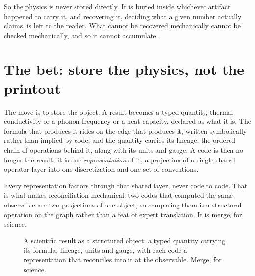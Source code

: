 \documentclass[11pt,a4paper]{article}
\begin{document}
So the physics is never stored directly. It is buried inside whichever artifact
happened to carry it, and recovering it, deciding what a given number actually
claims, is left to the reader. What cannot be recovered mechanically cannot be
checked mechanically, and so it cannot accumulate.

\section{The bet: store the physics, not the printout}

The move is to store the object. A result becomes a typed quantity, thermal
conductivity or a phonon frequency or a heat capacity, declared as what it is. The
formula that produces it rides on the edge that produces it, written symbolically
rather than implied by code, and the quantity carries its lineage, the ordered
chain of operations behind it, along with its units and gauge. A code is then no
longer the result; it is one \emph{representation} of it, a projection of a single
shared operator layer into one discretization and one set of conventions.

Every representation factors through that shared layer, never code to code. That
is what makes reconciliation mechanical: two codes that computed the same
observable are two projections of one object, so comparing them is a structural
operation on the graph rather than a feat of expert translation. It is merge, for
science.

\begin{figure}[h]
\centering
{}
\caption{A scientific result as a structured object: a typed quantity carrying its
formula, lineage, units and gauge, with each code a representation that reconciles
into it at the observable. Merge, for science.}
\end{figure}
\end{document}
